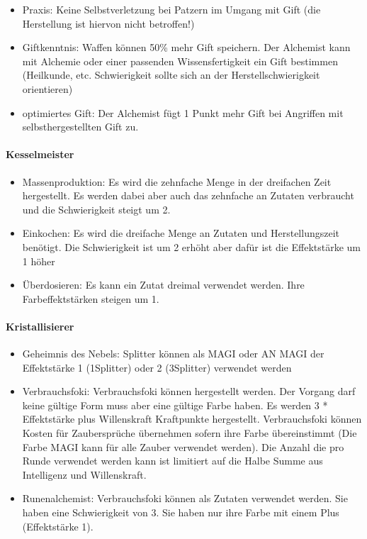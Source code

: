 \documentclass{article}
\begin{document}
\begin{itemize}
\item Praxis: Keine Selbstverletzung bei Patzern im Umgang mit Gift (die Herstellung ist hiervon nicht betroffen!)
\item Giftkenntnis: Waffen können 50\% mehr Gift speichern. Der Alchemist kann mit Alchemie oder einer passenden Wissensfertigkeit ein Gift bestimmen (Heilkunde, etc. Schwierigkeit sollte sich an der Herstellschwierigkeit orientieren)
\item optimiertes Gift: Der Alchemist fügt 1 Punkt mehr Gift bei Angriffen mit selbsthergestellten Gift zu.
\end{itemize}

\paragraph{Kesselmeister}

\begin{itemize}
\item Massenproduktion: Es wird die zehnfache Menge in der dreifachen Zeit hergestellt. Es werden dabei aber auch das zehnfache an Zutaten verbraucht und die Schwierigkeit steigt um 2.
\item Einkochen: Es wird die dreifache Menge an Zutaten und Herstellungszeit benötigt. Die Schwierigkeit ist um 2 erhöht aber dafür ist die Effektstärke um 1 höher
\item Überdosieren: Es kann ein Zutat dreimal verwendet werden. Ihre Farbeffektstärken steigen um 1.
\end{itemize}

\paragraph{Kristallisierer}

\begin{itemize}
\item Geheimnis des Nebels: Splitter können als MAGI oder AN MAGI der Effektstärke 1 (1Splitter) oder 2 (3Splitter) verwendet werden
\item Verbrauchsfoki: Verbrauchsfoki können hergestellt werden. Der Vorgang darf keine gültige Form muss aber eine gültige Farbe haben. Es werden 3 * Effektstärke plus Willenskraft Kraftpunkte hergestellt. Verbrauchsfoki können Kosten für Zaubersprüche übernehmen sofern ihre Farbe übereinstimmt (Die Farbe MAGI kann für alle Zauber verwendet werden). Die Anzahl die pro Runde verwendet werden kann ist limitiert auf die Halbe Summe aus Intelligenz und Willenskraft.
\item Runenalchemist: Verbrauchsfoki können als Zutaten verwendet werden. Sie haben eine Schwierigkeit von 3. Sie haben nur ihre Farbe mit einem Plus (Effektstärke 1).
\end{itemize}
\end{document}
